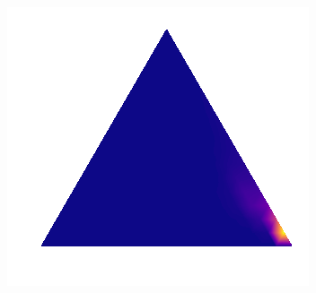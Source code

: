 \begin{figure}
\begin{minipage}{.3\textwidth}
\subcaption{}
\end{minipage}
 \begin{minipage}{.3\textwidth}
    \includegraphics[width=\textwidth]{plots/experiment_structures/triangle_0_2overfit.png}
\subcaption{}
\end{minipage}


\end{figure}
